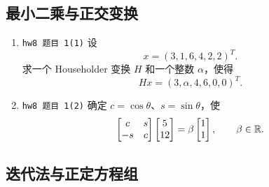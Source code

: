 \documentclass{article}
\begin{document}
\subsection{最小二乘与正交变换}

\begin{enumerate}
  \item \texttt{hw8 题目 1(1)} 设
  \[
    x=(3,1,6,4,2,2)^T.
  \]
  求一个 Householder 变换 $H$ 和一个整数 $\alpha$，使得
  \[
    Hx=(3,\alpha,4,6,0,0)^T.
  \]

  \item \texttt{hw8 题目 1(2)} 确定 $c=\cos\theta$、$s=\sin\theta$，使
  \[
    \begin{bmatrix}c&s\\-s&c\end{bmatrix}
    \begin{bmatrix}5\\12\end{bmatrix}
    =
    \beta\begin{bmatrix}1\\1\end{bmatrix},\qquad \beta\in\mathbb{R}.
  \]
\end{enumerate}

\subsection{迭代法与正定方程组}
\end{document}

